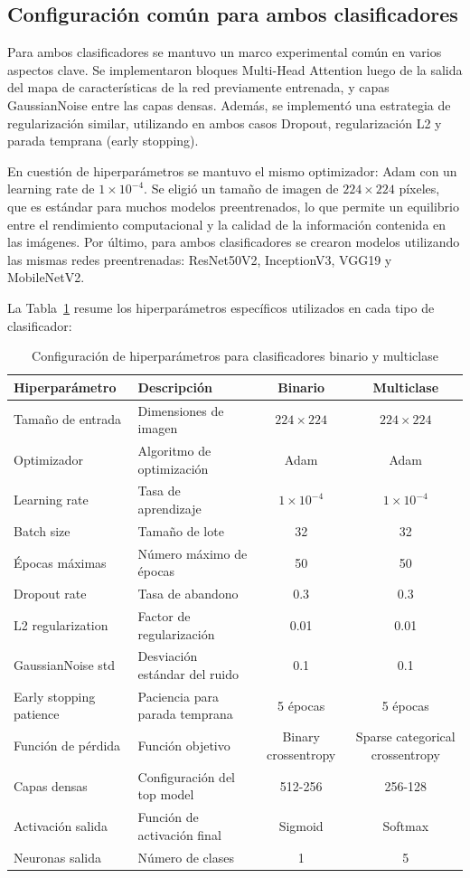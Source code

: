 \subsection{Configuración común para ambos clasificadores}

Para ambos clasificadores se mantuvo un marco experimental común en varios aspectos clave. Se implementaron bloques Multi-Head Attention luego de la salida del mapa de características de la red previamente entrenada, y capas GaussianNoise entre las capas densas. Además, se implementó una estrategia de regularización similar, utilizando en ambos casos Dropout, regularización L2 y parada temprana (early stopping).

En cuestión de hiperparámetros se mantuvo el mismo optimizador: Adam con un learning rate de $1 \times 10^{-4}$. Se eligió un tamaño de imagen de $224 \times 224$ píxeles, que es estándar para muchos modelos preentrenados, lo que permite un equilibrio entre el rendimiento computacional y la calidad de la información contenida en las imágenes. Por último, para ambos clasificadores se crearon modelos utilizando las mismas redes preentrenadas: ResNet50V2, InceptionV3, VGG19 y MobileNetV2.

La Tabla~\ref{tab:hiperparametros} resume los hiperparámetros específicos utilizados en cada tipo de clasificador:

\begin{table}[H]
\centering
\renewcommand{\arraystretch}{1.3}
\caption{Configuración de hiperparámetros para clasificadores binario y multiclase}
\label{tab:hiperparametros}
\begin{tabularx}{\textwidth}{l X c c}
\hline
\textbf{Hiperparámetro} & \textbf{Descripción} & \textbf{Binario} & \textbf{Multiclase} \\ \hline
Tamaño de entrada & Dimensiones de imagen & $224 \times 224$ & $224 \times 224$ \\
Optimizador & Algoritmo de optimización & Adam & Adam \\
Learning rate & Tasa de aprendizaje & $1 \times 10^{-4}$ & $1 \times 10^{-4}$ \\
Batch size & Tamaño de lote & 32 & 32 \\
Épocas máximas & Número máximo de épocas & 50 & 50 \\
Dropout rate & Tasa de abandono & 0.3 & 0.3 \\
L2 regularization & Factor de regularización & 0.01 & 0.01 \\
GaussianNoise std & Desviación estándar del ruido & 0.1 & 0.1 \\
Early stopping patience & Paciencia para parada temprana & 5 épocas & 5 épocas \\
Función de pérdida & Función objetivo & Binary crossentropy & Sparse categorical crossentropy \\
Capas densas & Configuración del top model & 512-256 & 256-128 \\
Activación salida & Función de activación final & Sigmoid & Softmax \\
Neuronas salida & Número de clases & 1 & 5 \\ \hline
\end{tabularx}
\end{table}

